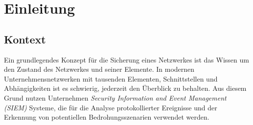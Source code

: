 \chapter{Einleitung}
\label{cha:Einleitung}
\section{Kontext}
 
Ein grundlegendes Konzept für die Sicherung eines Netzwerkes ist das Wissen um den Zustand des Netzwerkes und seiner Elemente. In modernen Unternehmensnetzwerken mit tausenden Elementen, Schnittstellen und Abhängigkeiten ist es schwierig, jederzeit den Überblick zu behalten. Aus diesem Grund nutzen Unternehmen \textit{Security Information and Event Management (SIEM)} Systeme, die für die Analyse protokollierter Ereignisse und der Erkennung von potentiellen Bedrohungsszenarien verwendet werden.  

